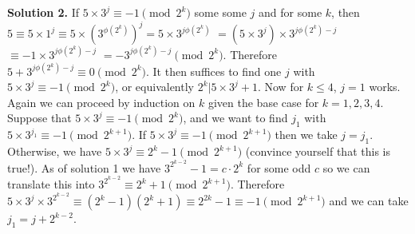 \documentclass[11pt]{article}
\begin{document}
\begin{enumerate}
\textbf {Solution 2.} If $5\times 3^j\equiv -1\pmod {2^k}$ some some $j$ and for some $k$, then $5\equiv 5\times 1^j\equiv 5\times (3^{\phi (2^k)})^j=5\times 3^{j\phi (2^k)}$
$=(5\times 3^j) \times 3^{j\phi (2^k)-j}$
$\equiv -1\times  3^{j\phi (2^k)-j}$
$=-3^{j\phi (2^k)-j}\pmod {2^k}$.
Therefore $5+3^{j\phi (2^k)-j}\equiv 0\pmod {2^k}$. It then suffices to find one $j$ with $5\times 3^j\equiv -1\pmod {2^k}$, or equivalently $2^k|5\times 3^j+1$. Now for $k\le 4$, $j=1$ works. Again we can proceed by induction on $k$ given the base case for $k=1,2,3,4$. Suppose that $5\times 3^j\equiv -1\pmod {2^k}$, and we want to find $j_1$ with $5\times 3^{j_1}\equiv -1\pmod {2^{k+1}}.$ If $5\times 3^j\equiv -1\pmod {2^{k+1}}$ then we take $j=j_1$. Otherwise, we have $5\times 3^j\equiv 2^k-1\pmod {2^{k+1}}$ (convince yourself that this is true!). As of solution 1 we have $3^{2^{k-2}}-1=c\cdot 2^k$ for some odd $c$ so we can translate this into $3^{2^{k-2}}\equiv 2^k+1\pmod{2^{k+1}}$. Therefore $5\times 3^j\times 3^{2^{k-2}}\equiv (2^k-1)(2^k+1)\equiv 2^{2k}-1\equiv -1\pmod {2^{k+1}}$ and we can take $j_1=j+2^{k-2}$.
\end{enumerate}
\end{document}
